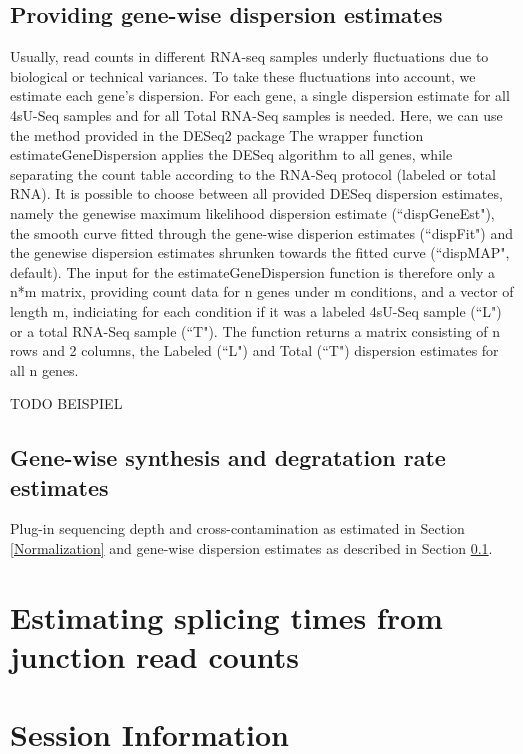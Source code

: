 \documentclass{article}\usepackage[]{graphicx}\usepackage[usenames,dvipsnames]{color}
\begin{document}
\subsection{Providing gene-wise dispersion estimates} \label{Dispersion}
Usually, read counts in different RNA-seq samples underly fluctuations due to biological or technical variances.
To take these fluctuations into account, we estimate each gene's dispersion.
For each gene, a single dispersion estimate for all 4sU-Seq samples and for all
Total RNA-Seq samples is needed. Here, we can use the method provided in the
DESeq2 package \cite{Love2014} The wrapper function estimateGeneDispersion
applies the DESeq algorithm to all genes, while separating the count table
according to the RNA-Seq protocol (labeled or total RNA). It is possible to
choose between all provided DESeq dispersion estimates, namely the genewise
maximum likelihood dispersion estimate (``dispGeneEst"), the smooth curve fitted
through the gene-wise disperion estimates (``dispFit") and the genewise
dispersion estimates shrunken towards the fitted curve (``dispMAP", default).
The input for the estimateGeneDispersion function is therefore only a n*m
matrix, providing count data for n genes under m conditions, and a vector of
length m, indiciating for each condition if it was a labeled 4sU-Seq sample
(``L") or a total RNA-Seq sample (``T"). The function returns a matrix consisting
of n rows and 2 columns, the Labeled (``L") and Total (``T") dispersion estimates
for all n genes.

TODO BEISPIEL

\subsection{Gene-wise synthesis and degratation rate estimates}

Plug-in sequencing depth and cross-contamination as estimated in Section \ref{Normalization} and gene-wise dispersion estimates as described in Section \ref{Dispersion}.


\section{Estimating splicing times from junction read counts} \label{Splicing}

\section{Session Information}
\end{document}
